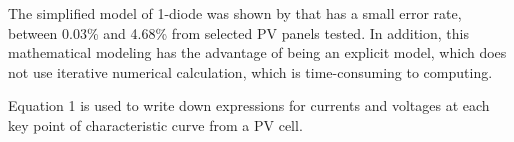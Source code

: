\documentclass[journal]{IEEEtran}
\begin{document}
The simplified model of 1-diode was shown by \cite{Saloux} that has a small error rate, between 0.03\% and 4.68\% from selected PV panels tested. In addition, this mathematical modeling has the advantage of being an explicit model, which does not use iterative numerical calculation, which is time-consuming to computing. 
 
%
Equation 1 is used to write down expressions for currents and voltages at each key point of characteristic curve from a PV cell.
%
\end{document}
